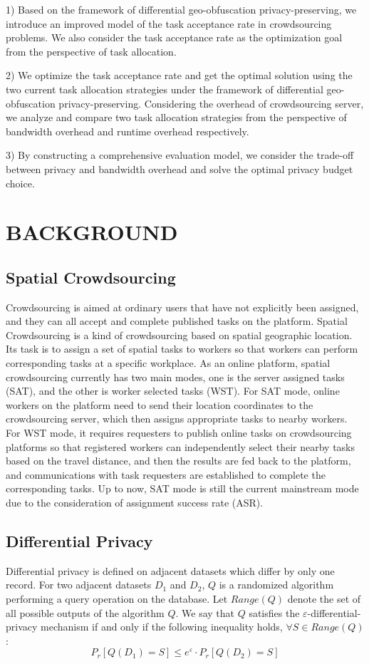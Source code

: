 1) Based on the framework of differential geo-obfuscation privacy-preserving, we introduce an improved model of the task acceptance rate in crowdsourcing problems. We also consider the task acceptance rate as the optimization goal from the perspective of task allocation.

2) We optimize the task acceptance rate and get the optimal solution using the two current task allocation strategies under the framework of differential geo-obfuscation privacy-preserving. Considering the overhead of crowdsourcing server, we analyze and compare two task allocation strategies from the perspective of bandwidth overhead and runtime overhead respectively.

3) By constructing a comprehensive evaluation model, we consider the trade-off between privacy and bandwidth overhead and solve the optimal privacy budget choice.

\section{BACKGROUND} %
\subsection{Spatial Crowdsourcing} %
Crowdsourcing is aimed at ordinary users that have not explicitly been assigned, and they can all accept and complete published tasks on the platform. Spatial Crowdsourcing is a kind of crowdsourcing based on spatial geographic location. Its task is to assign a set of spatial tasks to workers so that workers can perform corresponding tasks at a specific workplace. As an online platform, spatial crowdsourcing currently has two main modes, one is the server assigned tasks (SAT), and the other is worker selected tasks (WST). For SAT mode, online workers on the platform need to send their location coordinates to the crowdsourcing server, which then assigns appropriate tasks to nearby workers. For WST mode, it requires requesters to publish online tasks on crowdsourcing platforms so that registered workers can independently select their nearby tasks based on the travel distance, and then the results are fed back to the platform, and communications with task requesters are established to complete the corresponding tasks. Up to now, SAT mode is still the current mainstream mode due to the consideration of assignment success rate (ASR).

\subsection{Differential Privacy} %
\begin{definition}
	Differential privacy is defined on adjacent datasets which differ by only one record. For two adjacent datasets $D_1$ and $D_2$, $Q$ is a randomized algorithm performing a query operation on the database. Let $Range(Q)$ denote the set of all possible outputs of the algorithm $Q$. We say that $Q$ satisfies the $\varepsilon$-differential-privacy mechanism if and only if the following inequality holds, $\forall S \in Range(Q)$:
	$$
	P_r[Q(D_1)=S]\leq e^\varepsilon \cdot P_r [Q(D_2)=S]
	$$
\end{definition}

